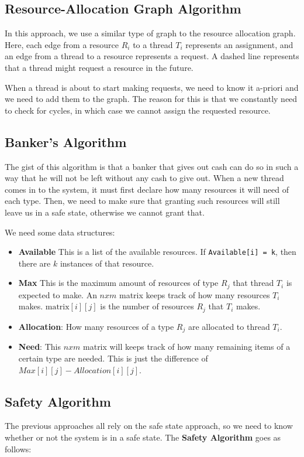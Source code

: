 \documentclass{tufte-handout}
\begin{document}
\subsection{Resource-Allocation Graph Algorithm}
In this approach, we use a similar type of graph to the resource allocation 
graph. Here, each edge from a resource $R_{i}$ to a thread $T_{i}$ represents
an assignment, and an edge from a thread to a resource represents a request. 
A dashed line represents that a thread might request a resource in the future.

When a thread is about to start making requests, we need to know it a-priori
and we need to add them to the graph. The reason for this is that we constantly 
need to check for cycles, in which case we cannot assign the requested resource.

\subsection{Banker's Algorithm}
The gist of this algorithm is that a banker that gives out cash can do so in such 
a way that he will not be left without any cash to give out. When a new thread
comes in to the system, it must first declare how many resources it will need of 
each type. Then, we need to make sure that granting such resources will still leave
us in a safe state, otherwise we cannot grant that.

We need some data structures:
\begin{itemize}
	\item \textbf{Available} This is a list of the available resources. If 
			\texttt{Available[i] = k}, then there are $k$ instances of 
			that resource.
	\item \textbf{Max} This is the maximum amount of resources of type $R_{j}$ that
			thread $T_{i}$ is expected to make. An $n x m$ matrix keeps track
			of how many resources $T_{i}$ makes. $\textrm{matrix}[i][j]$ is the 
			number of resources $R_{j}$ that $T_{i}$ makes.
	\item \textbf{Allocation}: How many resources of a type $R_{j}$ are allocated
			to thread $T_{i}$. 
	\item \textbf{Need}: This $n x m$ matrix will keeps track of how many remaining
			items of a certain type are needed. This is just the difference of 
			$Max[i][j] - Allocation[i][j]$. 
\end{itemize}

\subsection{Safety Algorithm}
The previous approaches all rely on the safe state approach, so we need to know 
whether or not the system is in a safe state. The \textbf{Safety Algorithm}
goes as follows:
\end{document}
